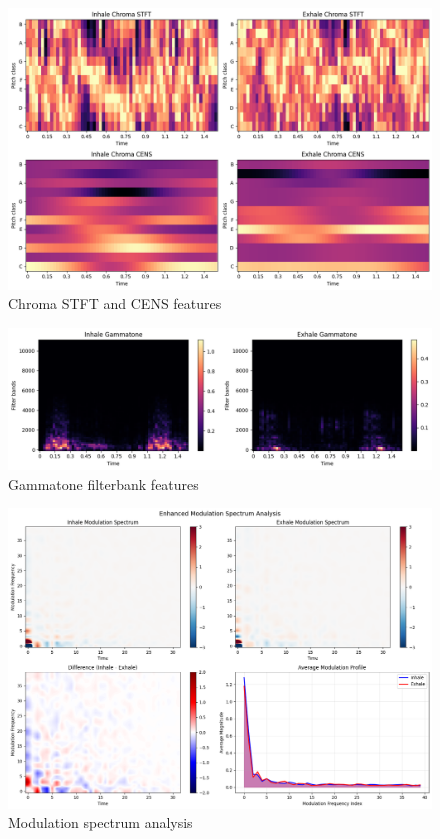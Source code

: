 \begin{figure}[ht!]
\centering
\includegraphics[width=\columnwidth]{figures/chroma}	
\caption{Chroma STFT and CENS features}
\label{fig:chroma}
\end{figure}

\begin{figure}[h!]
\centering
\includegraphics[width=\columnwidth]{figures/gammatone}	
\caption{Gammatone filterbank features}
\label{fig:gammatone}
\end{figure}

\begin{figure}[h!]
\centering
\includegraphics[width=\columnwidth]{figures/modulation}	
\caption{Modulation spectrum analysis}
\label{fig:modulation}
\end{figure}

